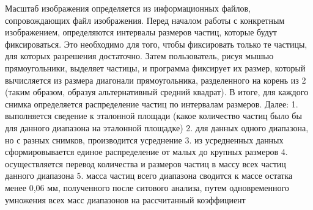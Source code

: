 Масштаб изображения определяется из информационных файлов, сопровождающих файл изображения. Перед началом работы с конкретным изображением, определяются интервалы размеров частиц, которые будут фиксироваться. Это необходимо для того, чтобы фиксировать только те частицы, для которых разрешения достаточно. Затем пользователь, рисуя мышью прямоугольники, выделяет частицы, и программа фиксирует их размер, который вычисляется из размера диагонали прямоугольника, разделенного на корень из 2 (таким образом, образуя альтернативный средний квадрат).
В итоге, для каждого снимка определяется распределение частиц по интервалам размеров.
Далее:
1.	выполняется сведение к эталонной площади (какое количество частиц было бы для данного диапазона на эталонной площадке)
2.	для данных одного диапазона, но с разных снимков, производится усреднение
3.	из усредненных данных сформировывается единое распределение от малых до крупных размеров
4.	осуществляется перевод количества и размеров частиц в массу всех частиц данного диапазона
5.	масса частиц всего диапазона сводится к массе остатка менее 0,06 мм, полученного после ситового анализа, путем одновременного умножения всех масс диапазонов на рассчитанный коэффициент 



\clearpage